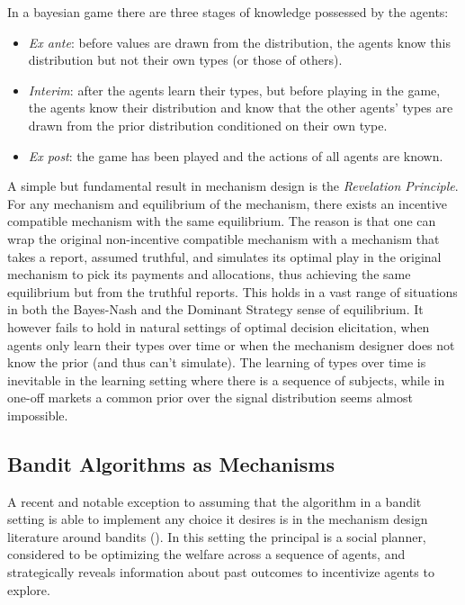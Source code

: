 In a bayesian game there are three stages of knowledge possessed by the agents:
\begin{itemize}
   \item \emph{Ex ante}: before values are drawn from the distribution, the agents know this distribution but not their own types (or those of others).
   \item \emph{Interim}: after the agents learn their types, but before playing in the game, the agents know their distribution and know that the other agents' types are drawn from the prior distribution conditioned on their own type.
   \item \emph{Ex post}: the game has been played and the actions of all agents are known.
\end{itemize}

A simple but fundamental result in mechanism design is the \emph{Revelation Principle}.
For any mechanism and equilibrium of the mechanism, there exists an incentive compatible mechanism with the same equilibrium.
The reason is that one can wrap the original non-incentive compatible mechanism with a mechanism that takes a report, assumed truthful, and simulates its optimal play in the original mechanism to pick its payments and allocations, thus achieving the same equilibrium but from the truthful reports. 
This holds in a vast range of situations in both the Bayes-Nash and the Dominant Strategy sense of equilibrium. %
It however fails to hold in natural settings of optimal decision elicitation, when agents only learn their types over time or when the mechanism designer does not know the prior (and thus can't simulate).
The learning of types over time is inevitable in the learning setting where there is a sequence of subjects, while in one-off markets a common prior over the signal distribution seems almost impossible.




\subsection{Bandit Algorithms as Mechanisms}


A recent and notable exception to assuming that the algorithm in a bandit setting is able to implement any choice it desires is in the mechanism design literature around bandits (\cite{kremer2014implementing,mansour2015bayesian}).
In this setting the principal is a social planner,  considered to be optimizing the welfare across a sequence of agents, and strategically reveals information about past outcomes to incentivize agents to explore.

